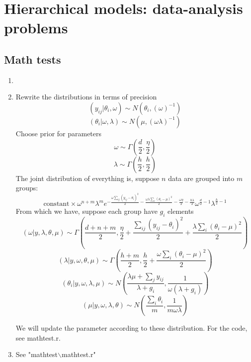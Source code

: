 \documentclass{article}
\begin{document}
\section{Hierarchical models: data-analysis problems}
\subsection{Math tests}
\begin{enumerate}
\item
\item
Rewrite the distributions in terms of precision
\[
(y_{ij}|\theta_i,\omega)\sim N(\theta_i,(\omega)^{-1})
\]
\[
(\theta_i|\omega,\lambda)\sim N(\mu,(\omega\lambda)^{-1})
\]
Choose prior for parameters
\[
\omega\sim \Gamma(\frac{d}{2},\frac{\eta}{2})
\]
\[
\lambda\sim \Gamma(\frac{h}{2},\frac{h}{2})
\]
The joint distribution of everything is, suppose $n$ data are grouped into $m$ groups:
\[
\textrm{constant}\times \omega^{n+m}\lambda^{m} e^{-\frac{\omega\sum_{ij}(y_{ij}-\theta_i)^2}{2}-\frac{\omega\lambda\sum_i(\theta_i-\mu)^2}{2}-\frac{\omega\eta}{2}-\frac{h\lambda}{2}}\omega^{\frac{d}{2}-1}\lambda^{\frac{h}{2}-1}
\]
From which we have, suppose each group have $g_i$ elements
\[
(\omega|y,\lambda,\theta,\mu)\sim\Gamma(\frac{d+n+m}{2},\frac{\eta}{2}+\frac{\sum_{ij}(y_{ij}-\theta_i)^2}{2}+\frac{\lambda\sum_i(\theta_i-\mu)^2}{2})
\]
\[
(\lambda|y,\omega,\theta,\mu)\sim\Gamma(\frac{h+m}{2},\frac{h}{2}+\frac{\omega\sum_i(\theta_i-\mu)^2}{2})
\]
\[
(\theta_i|y,\omega,\lambda,\mu)\sim N(\frac{\lambda\mu+\sum_jy_{ij}}{\lambda+g_i},\frac{1}{\omega(\lambda+g_i)})
\]
\[
(\mu|y,\omega,\lambda,\theta)\sim N(\frac{\sum_i\theta_i}{m},\frac{1}{m\omega\lambda})
\]

We will update the parameter according to these distribution. For the code, see mathtest.r.

\item
See "mathtest$\backslash$mathtest.r"
\end{enumerate}
\end{document}
